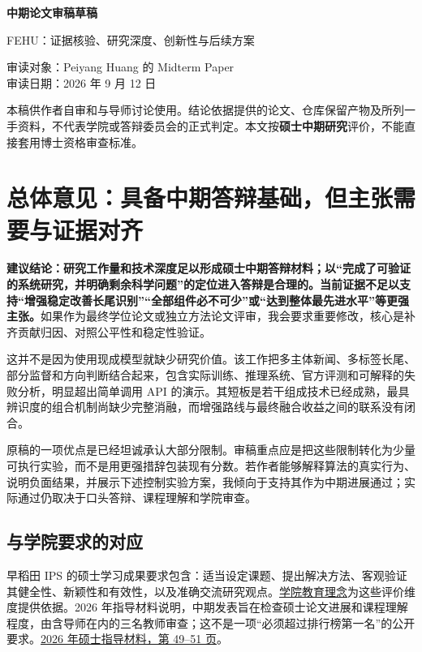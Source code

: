 \documentclass[12pt,a4paper]{article}
\begin{document}
\begin{center}
{\fontsize{20}{26}\selectfont\bfseries 中期论文审稿草稿\par}
\vspace{8pt}
{\large FEHU：证据核验、研究深度、创新性与后续方案\par}
\vspace{8pt}
审读对象：Peiyang Huang 的 Midterm Paper\\
审读日期：2026 年 9 月 12 日
\end{center}
\noindent 本稿供作者自审和与导师讨论使用。结论依据提供的论文、仓库保留产物及所列一手资料，不代表学院或答辩委员会的正式判定。本文按\textbf{硕士中期研究}评价，不能直接套用博士资格审查标准。

\section{总体意见：具备中期答辩基础，但主张需要与证据对齐}
\textbf{建议结论：研究工作量和技术深度足以形成硕士中期答辩材料；以“完成了可验证的系统研究，并明确剩余科学问题”的定位进入答辩是合理的。当前证据不足以支持“增强稳定改善长尾识别”“全部组件必不可少”或“达到整体最先进水平”等更强主张。}如果作为最终学位论文或独立方法论文评审，我会要求重要修改，核心是补齐贡献归因、对照公平性和稳定性验证。

这并不是因为使用现成模型就缺少研究价值。该工作把多主体新闻、多标签长尾、部分监督和方向判断结合起来，包含实际训练、推理系统、官方评测和可解释的失败分析，明显超出简单调用 API 的演示。其短板是若干组成技术已经成熟，最具辨识度的组合机制尚缺少完整消融，而增强路线与最终融合收益之间的联系没有闭合。

原稿的一项优点是已经坦诚承认大部分限制。审稿重点应是把这些限制转化为少量可执行实验，而不是用更强措辞包装现有分数。若作者能够解释算法的真实行为、说明负面结果，并展示下述控制实验方案，我倾向于支持其作为中期进展通过；实际通过仍取决于口头答辩、课程理解和学院审查。

\subsection{与学院要求的对应}
早稻田 IPS 的硕士学习成果要求包含：适当设定课题、提出解决方法、客观验证其健全性、新颖性和有效性，以及准确交流研究观点。\href{https://www.waseda.jp/fsci/gips/about/policy/}{学院教育理念}为这些评价维度提供依据。2026 年指导材料说明，中期发表旨在检查硕士论文进展和课程理解程度，由含导师在内的三名教师审查；这不是一项“必须超过排行榜第一名”的公开要求。\href{https://www.waseda.jp/fsci/gips/assets/uploads/2026/02/Guidance-for-Master-course-students-Apr.2026_J-1.pdf}{2026 年硕士指导材料，第 49--51 页}。
\end{document}
